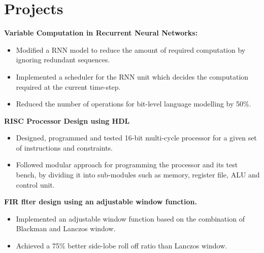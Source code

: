 \section{Projects}

{\textbf{Variable Computation in Recurrent Neural Networks:}
    \begin{itemize}
        \item Modified a RNN model to reduce the amount of required computation by ignoring redundant sequences.
        \item Implemented a scheduler for the RNN unit which decides the computation required at the current time-step.
        \item Reduced the number of operations for bit-level language modelling by 50\%.
    \end{itemize}
}

{\textbf{RISC Processor Design using HDL}
    \begin{itemize}
        \item Designed, programmed and tested 16-bit multi-cycle processor for a given set of instructions and constraints.
        \item Followed modular approach for programming the processor and its test bench, by dividing it into sub-modules such as memory, register file, ALU and control unit.
    \end{itemize}
}

{\textbf{FIR flter design using an adjustable window function.}
    \begin{itemize}
        \item Implemented an adjustable window function based on the combination of Blackman and Lanczos window.
        \item Achieved a 75\% better side-lobe roll off ratio than Lanczos window.
    \end{itemize}
}
